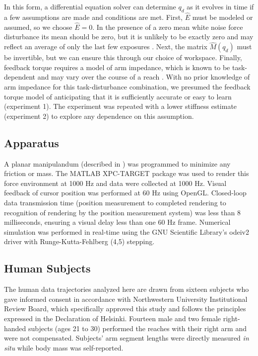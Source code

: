 \documentclass{frontiersSCNS} %
\begin{document}
\begin{methods}
In this form, a differential equation solver can determine $q_d$ as it evolves in time if a few assumptions are made and conditions are met. First, $\hat{E}$ must be modeled or assumed, so we choose $\hat{E}=0$. In the presence of a zero mean white noise force disturbance its mean should be zero, but it is unlikely to be exactly zero and may reflect an average of only the last few exposures \citep{scheidt2001learning}. Next, the matrix $\hat{M}(q_d)$ must be invertible, but we can ensure this through our choice of workspace. Finally, feedback torque requires a model of arm impedance, which is known to be task-dependent \citep{gomi1998task} and may vary over the course of a reach \citep{niu2010temporal}. With no prior knowledge of arm impedance for this task-disturbance combination, we presumed the feedback torque model of \cite{shadmehr1994adaptive} anticipating that it is sufficiently accurate or easy to learn (experiment 1). The experiment was repeated with a lower stiffness estimate (experiment 2) to explore any dependence on this assumption.

\subsection{Apparatus}
A planar manipulandum (described in \cite{patton2004robot}) was programmed to minimize any friction or mass. The MATLAB XPC-TARGET package \citep{MATLAB:2008} was used to render this force environment at 1000 Hz and data were collected at 1000 Hz.  Visual feedback of cursor position was performed at 60 Hz using OpenGL. Closed-loop data transmission time (position measurement to completed rendering to recognition of rendering by the position measurement system) was less than 8 milliseconds, ensuring a visual delay less than one 60 Hz frame. Numerical simulation was performed in real-time using the GNU Scientific Library's odeiv2 driver with Runge-Kutta-Fehlberg (4,5) stepping\citep{gough2009gnu}.

\subsection{Human Subjects}
The human data trajectories analyzed here are drawn from sixteen subjects who gave informed consent in accordance with Northwestern University Institutional Review Board, which specifically approved this study and follows the principles expressed in the Declaration of Helsinki. Fourteen male and two female right-handed subjects (ages 21 to 30) performed the reaches with their right arm and were not compensated. Subjects' arm segment lengths were directly measured \textit{in situ} while body mass was self-reported.


\end{methods}
\end{document}
